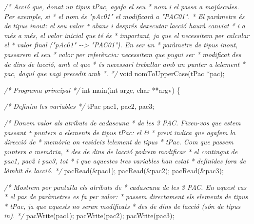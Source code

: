 \documentclass[]{book}
\newenvironment{Shaded}{\begin{snugshade}}{\end{snugshade}}
\newcommand{\CommentTok}[1]{\textcolor[rgb]{0.56,0.35,0.01}{\textit{#1}}}
\newcommand{\DataTypeTok}[1]{\textcolor[rgb]{0.13,0.29,0.53}{#1}}
\newcommand{\NormalTok}[1]{#1}
\begin{document}
\begin{Shaded}
\begin{Highlighting}[]
\CommentTok{/* Acció que, donat un tipus tPac, agafa el seu}
\CommentTok{ * nom i el passa a majúscules. Per exemple, si}
\CommentTok{ * el nom és "pAc01" el modificarà a "PAC01".}
\CommentTok{ * El paràmetre és de tipus \textquotesingle{}inout\textquotesingle{}: el seu valor}
\CommentTok{ * abans i després d\textquotesingle{}executar l\textquotesingle{}acció haurà canviat}
\CommentTok{ * i a més a més, el valor inicial que té és}
\CommentTok{ * important, ja que el necessitem per calcular el}
\CommentTok{ * valor final ("pAc01" {-}{-}\textgreater{} "PAC01"). En ser un}
\CommentTok{ * paràmetre de tipus \textquotesingle{}inout\textquotesingle{}, passarem el seu}
\CommentTok{ * valor per referència: necessitem que pugui ser}
\CommentTok{ * modificat des de dins de l\textquotesingle{}acció, amb el que}
\CommentTok{ * és necessari treballar amb un punter a l\textquotesingle{}element}
\CommentTok{ * pac, d\textquotesingle{}aquí que vagi precedit amb *.}
\CommentTok{ */}
\DataTypeTok{void}\NormalTok{ nomToUpperCase(tPac *pac);}

\CommentTok{/* Programa principal */}
\DataTypeTok{int}\NormalTok{ main(}\DataTypeTok{int}\NormalTok{ argc, }\DataTypeTok{char}\NormalTok{ **argv) \{}
    
    \CommentTok{/* Definim les variables */}
\NormalTok{    tPac pac1, pac2, pac3;}

    \CommentTok{/* Donem valor als atributs de cadascuna}
\CommentTok{     * de les 3 PAC. Fixeu{-}vos que estem passant}
\CommentTok{     * punters a elements de tipus tPac: el \&}
\CommentTok{     * previ indica que agafem la direcció de }
\CommentTok{     * memòria on resideix l\textquotesingle{}element de tipus }
\CommentTok{     * tPac. Com que passem punters a memòria, }
\CommentTok{     * des de dins de l\textquotesingle{}acció podrem modificar}
\CommentTok{     * el contingut de pac1, pac2 i pac3, tot}
\CommentTok{     * i que aquestes tres variables han estat}
\CommentTok{     * definides fora de l\textquotesingle{}àmbit de l\textquotesingle{}acció.}
\CommentTok{     */}
\NormalTok{    pacRead(\&pac1);}
\NormalTok{    pacRead(\&pac2);}
\NormalTok{    pacRead(\&pac3);}
    
    \CommentTok{/* Mostrem per pantalla els atributs de}
\CommentTok{     * cadascuna de les 3 PAC. En aquest cas}
\CommentTok{     * el pas de paràmetres es fa per valor:}
\CommentTok{     * passem directament els elements de tipus}
\CommentTok{     * tPac, ja que aquests no seran modificats}
\CommentTok{     * des de dins de l\textquotesingle{}acció (són de tipus \textquotesingle{}in\textquotesingle{}).}
\CommentTok{     */}
\NormalTok{    pacWrite(pac1);}
\NormalTok{    pacWrite(pac2);}
\NormalTok{    pacWrite(pac3);}


\end{Highlighting}
\end{Shaded}
\end{document}
